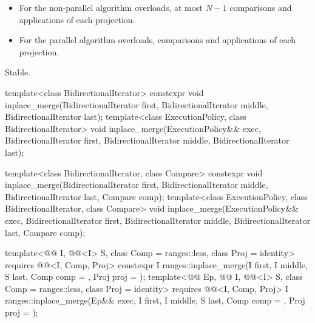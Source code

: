 \begin{itemdescr}
\pnum
\complexity
\begin{itemize}
\item
  For the non-parallel algorithm overloads,
  at most $N - 1$ comparisons and applications of each projection.
\item
  For the parallel algorithm overloads,
   comparisons and applications of each projection.
\end{itemize}

\pnum
\remarks
Stable.
\end{itemdescr}

%
\begin{itemdecl}
template<class BidirectionalIterator>
  constexpr void inplace_merge(BidirectionalIterator first,
                               BidirectionalIterator middle,
                               BidirectionalIterator last);
template<class ExecutionPolicy, class BidirectionalIterator>
  void inplace_merge(ExecutionPolicy&& exec,
                     BidirectionalIterator first,
                     BidirectionalIterator middle,
                     BidirectionalIterator last);

template<class BidirectionalIterator, class Compare>
  constexpr void inplace_merge(BidirectionalIterator first,
                               BidirectionalIterator middle,
                               BidirectionalIterator last, Compare comp);
template<class ExecutionPolicy, class BidirectionalIterator, class Compare>
  void inplace_merge(ExecutionPolicy&& exec,
                     BidirectionalIterator first,
                     BidirectionalIterator middle,
                     BidirectionalIterator last, Compare comp);

template<@@ I, @@<I> S, class Comp = ranges::less,
         class Proj = identity>
  requires @@<I, Comp, Proj>
  constexpr I ranges::inplace_merge(I first, I middle, S last, Comp comp = {}, Proj proj = {});
template<@@ Ep, @@ I, @@<I> S,
         class Comp = ranges::less, class Proj = identity>
  requires @@<I, Comp, Proj>
  I ranges::inplace_merge(Ep&& exec, I first, I middle, S last, Comp comp = {}, Proj proj = {});
\end{itemdecl}

